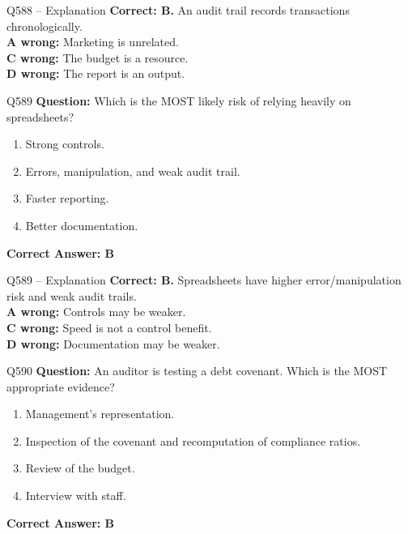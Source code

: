 \documentclass[aspectratio=169,10pt]{beamer}
\begin{document}
	\begin{frame}[t]{Q588 -- Explanation}
		\small
		\textbf{Correct: B.} An audit trail records transactions chronologically. \\[4pt]
		\textbf{A wrong:} Marketing is unrelated. \\[2pt]
		\textbf{C wrong:} The budget is a resource. \\[2pt]
		\textbf{D wrong:} The report is an output.
	\end{frame}
	
	\begin{frame}[t]{Q589}
		\small
		\textbf{Question:} Which is the MOST likely risk of relying heavily on spreadsheets?
		\begin{enumerate}[label=\Alph*.,itemsep=1pt,topsep=2pt]
			\item Strong controls.
			\item Errors, manipulation, and weak audit trail.
			\item Faster reporting.
			\item Better documentation.
		\end{enumerate}
		\vspace{4pt}
		\textbf{Correct Answer: B}
	\end{frame}
	
	\begin{frame}[t]{Q589 -- Explanation}
		\small
		\textbf{Correct: B.} Spreadsheets have higher error/manipulation risk and weak audit trails. \\[4pt]
		\textbf{A wrong:} Controls may be weaker. \\[2pt]
		\textbf{C wrong:} Speed is not a control benefit. \\[2pt]
		\textbf{D wrong:} Documentation may be weaker.
	\end{frame}
	
	\begin{frame}[t]{Q590}
		\small
		\textbf{Question:} An auditor is testing a debt covenant. Which is the MOST appropriate evidence?
		\begin{enumerate}[label=\Alph*.,itemsep=1pt,topsep=2pt]
			\item Management's representation.
			\item Inspection of the covenant and recomputation of compliance ratios.
			\item Review of the budget.
			\item Interview with staff.
		\end{enumerate}
		\vspace{4pt}
		\textbf{Correct Answer: B}
	\end{frame}
	
\end{document}
